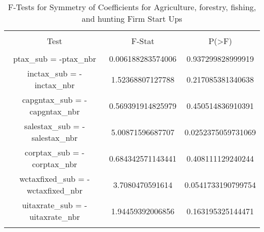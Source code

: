 
\begin{table}[!htbp] \centering 
  \caption{F-Tests for Symmetry of Coefficients for Agriculture, forestry, fishing, and hunting Firm Start Ups} 
  \label{} 
\begin{tabular}{@{\extracolsep{5pt}} ccc} 
\\[-1.8ex]\hline 
\hline \\[-1.8ex] 
Test & F-Stat & P(\textgreater F) \\ 
\hline \\[-1.8ex] 
ptax\_sub = -ptax\_nbr & 0.006188283574006 & 0.937299828999919 \\ 
inctax\_sub = -inctax\_nbr & 1.52368807127788 & 0.217085381340638 \\ 
capgntax\_sub = -capgntax\_nbr & 0.569391914825979 & 0.450514836910391 \\ 
salestax\_sub = -salestax\_nbr & 5.00871596687707 & 0.0252375059731069 \\ 
corptax\_sub = -corptax\_nbr & 0.684342571143441 & 0.408111129240244 \\ 
wctaxfixed\_sub = -wctaxfixed\_nbr & 3.7080470591614 & 0.0541733190799754 \\ 
uitaxrate\_sub = -uitaxrate\_nbr & 1.94459392006856 & 0.163195325144471 \\ 
\hline \\[-1.8ex] 
\end{tabular} 
\end{table} 

